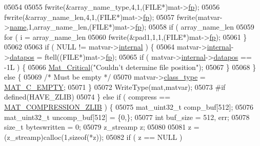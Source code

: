 \begin{DoxyCode}
{{{{{{{{{{{{{{{{{{{{{{{{{{{{{{05054 
05055             fwrite(&array\_name\_type,4,1,(FILE*)mat->\hyperlink{struct__mat__t_a85f562e407ca9ad4d2a6e14f839432b7}{fp});
05056             fwrite(&array\_name\_len,4,1,(FILE*)mat->\hyperlink{struct__mat__t_a85f562e407ca9ad4d2a6e14f839432b7}{fp});
05057             fwrite(matvar->\hyperlink{group___m_a_t_a5d4b55b041e3b4fb50c04337f05ad909}{name},1,array\_name\_len,(FILE*)mat->\hyperlink{struct__mat__t_a85f562e407ca9ad4d2a6e14f839432b7}{fp});
05058             \textcolor{keywordflow}{if} ( array\_name\_len %
05059                 \textcolor{keywordflow}{for} ( i = array\_name\_len %
05060                     fwrite(&pad1,1,1,(FILE*)mat->\hyperlink{struct__mat__t_a85f562e407ca9ad4d2a6e14f839432b7}{fp});
05061         \}
05062 
05063         \textcolor{keywordflow}{if} ( NULL != matvar->\hyperlink{group___m_a_t_a6e97e3ed9f40c49322c18561c2a94e92}{internal} ) \{
05064             matvar->\hyperlink{group___m_a_t_a6e97e3ed9f40c49322c18561c2a94e92}{internal}->\hyperlink{structmatvar__internal_afd3bfaab126a160bd6855563e1ea0a7e}{datapos} = ftell((FILE*)mat->\hyperlink{struct__mat__t_a85f562e407ca9ad4d2a6e14f839432b7}{fp});
05065             \textcolor{keywordflow}{if} ( matvar->\hyperlink{group___m_a_t_a6e97e3ed9f40c49322c18561c2a94e92}{internal}->\hyperlink{structmatvar__internal_afd3bfaab126a160bd6855563e1ea0a7e}{datapos} == -1L ) \{
05066                 \hyperlink{group__mat__util_gaf51f2bfbb5580f575e4dd79757e2b80c}{Mat\_Critical}(\textcolor{stringliteral}{"Couldn't determine file position"});
05067             \}
05068         \} \textcolor{keywordflow}{else} \{
05069             \textcolor{comment}{/* Must be empty */}
05070             matvar->\hyperlink{group___m_a_t_aff13035bf3265dd7d9425e5d40c839d4}{class\_type} = \hyperlink{group___m_a_t_ggad4d60ae7b709fc81bfd744fb4c857c40a5c76eef0ca0373d25abe49053be6fa9a}{MAT\_C\_EMPTY};
05071         \}
05072         WriteType(mat,matvar);
05073 \textcolor{preprocessor}{#if defined(HAVE\_ZLIB)}
05074     \} \textcolor{keywordflow}{else} \textcolor{keywordflow}{if} ( compress == \hyperlink{group___m_a_t_gga768c318af97bd2567758ecb001ceb7f4a5181d2f71eab0f12f05ba65d4f13fb53}{MAT\_COMPRESSION\_ZLIB} ) \{
05075         mat\_uint32\_t comp\_buf[512];
05076         mat\_uint32\_t uncomp\_buf[512] = \{0,\};
05077         \textcolor{keywordtype}{int} buf\_size = 512, err;
05078         \textcolor{keywordtype}{size\_t} byteswritten = 0;
05079         z\_streamp z;
05080 
05081         z = (z\_streamp)calloc(1,\textcolor{keyword}{sizeof}(*z));
05082         \textcolor{keywordflow}{if} ( z == NULL )
}}}}}}}}}}}}}}}}}}}}}}}}}}}}}}
\end{DoxyCode}
